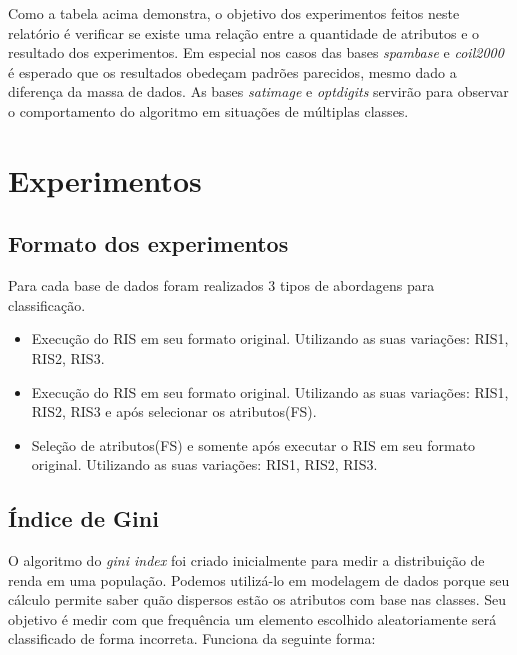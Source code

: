 \documentclass[a4paper, 12pt]{article}
\begin{document}
\begin{table}[h!]
\begin{center}
\begin{tabular}{l|c|c|c}
    \end{tabular}
  \end{center}
\end{table}

Como a tabela acima demonstra, o objetivo dos experimentos feitos neste relatório é verificar se existe uma relação entre a quantidade de atributos e o resultado dos experimentos. Em especial nos casos das bases \textit{spambase} e \textit{coil2000} é esperado que os resultados obedeçam padrões parecidos, mesmo dado a diferença da massa de dados. As bases \textit{satimage} e \textit{optdigits} servirão para observar o comportamento do algoritmo em situações de múltiplas classes.

\section{Experimentos}
\subsection{Formato dos experimentos}
Para cada base de dados foram realizados 3 tipos de abordagens para classificação.
\begin{itemize}
	\item Execução do RIS em seu formato original. Utilizando as suas variações: RIS1, RIS2, RIS3.
	\item Execução do RIS em seu formato original. Utilizando as suas variações: RIS1, RIS2, RIS3 e após selecionar os atributos(FS).
	\item Seleção de atributos(FS) e somente após executar o RIS em seu formato original. Utilizando as suas variações: RIS1, RIS2, RIS3.
\end{itemize}

\subsection{Índice de Gini}

O algoritmo do \textit{gini index} foi criado inicialmente para medir a distribuição de renda em uma população. Podemos utilizá-lo em modelagem de dados porque seu cálculo permite saber quão dispersos estão os atributos com base nas classes. Seu objetivo é medir com que frequência um elemento escolhido aleatoriamente será classificado de forma incorreta. Funciona da seguinte forma:
\end{document}
